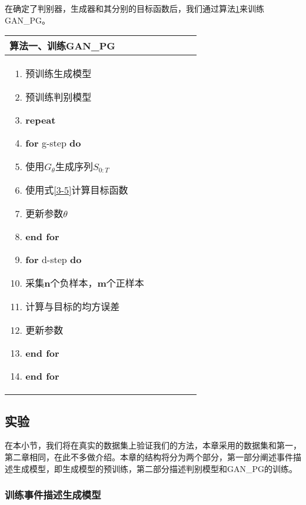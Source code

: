 \documentclass[]{template}
\begin{document}
在确定了判别器，生成器和其分别的目标函数后，我们通过算法\ref{s3-1}来训练GAN\_PG。
\linespread{0}
\begin{table}[htbp]
    \label{s3-1}
    \begin{center}
        \begin{tabular*}{.75\linewidth}{p{0.75\linewidth}}
\toprule
            算法一、训练GAN\_PG \\
\midrule
\begin{minipage}[t]{\linewidth}
\begin{enumerate}[itemsep=-2pt]
    \item 预训练生成模型
    \item 预训练判别模型
    \item \textbf{repeat}
    \item \quad \textbf{for} g-step \textbf{do}
    \item \quad \quad 使用$G_\theta$生成序列$S_{0:T}$
    \item \quad \quad 使用式\ref{3-5}计算目标函数
    \item \quad \quad 更新参数$\theta$
    \item \quad \textbf{end for}
    \item \quad \textbf{for} d-step \textbf{do}
    \item \quad \quad 采集\textbf{n}个负样本，\textbf{m}个正样本
    \item \quad \quad 计算与目标的均方误差
    \item \quad \quad 更新参数
    \item \quad \textbf{end for}  
    \item \textbf{end for}
\end{enumerate}
\end{minipage}\\
\bottomrule
        \end{tabular*}
    \end{center}
\end{table}
\linespread{1.3}

\subsection{实验}
在本小节，我们将在真实的数据集上验证我们的方法，本章采用的数据集和第一，第二章相同，在此不多做介绍。本章的结构将分为两个部分，第一部分阐述事件描述生成模型，即生成模型的预训练，第二部分描述判别模型和GAN\_PG的训练。
\subsubsection{训练事件描述生成模型}\label{train_generator}
\end{document}

